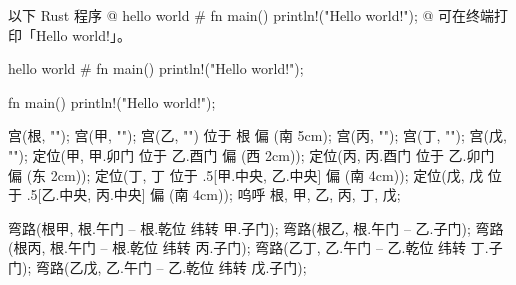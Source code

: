 \usemodule[zhfonts]
\setuptyping[before=,after=]
\startbuffer[all]
以下 Rust 程序
@ hello world #
fn main() {
    println!("Hello world!");
}
@
可在终端打印「Hello world!」。
\stopbuffer

\startbuffer[hello]
hello world #
fn main() {
    println!("Hello world!");
}
\stopbuffer

\startbuffer[foo]
fn main() {
    println!("Hello world!");
}
\stopbuffer


宫(根, "\startTEXpage\typebuffer[all]\stopTEXpage");
宫(甲, "");
宫(乙, "\startTEXpage\typebuffer[hello]\stopTEXpage") 位于 根 偏 (南 5cm);
宫(丙, "");
宫(丁, "");
宫(戊, "\startTEXpage\typebuffer[foo]\stopTEXpage");
定位(甲, 甲.卯门 位于 乙.酉门 偏 (西 2cm));
定位(丙, 丙.酉门 位于 乙.卯门 偏 (东 2cm));
定位(丁, 丁 位于 .5[甲.中央, 乙.中央] 偏 (南 4cm));
定位(戊, 戊 位于 .5[乙.中央, 丙.中央] 偏 (南 4cm));
呜呼 根, 甲, 乙, 丙, 丁, 戊;

弯路(根甲, 根.午门 -- 根.乾位 纬转 甲.子门);
弯路(根乙, 根.午门 -- 乙.子门);
弯路(根丙, 根.午门 -- 根.乾位 纬转 丙.子门);
弯路(乙丁, 乙.午门 -- 乙.乾位 纬转 丁.子门);
弯路(乙戊, 乙.午门 -- 乙.乾位 纬转 戊.子门);
\stopuseMPgraphic

\startTEXpage[offset=4pt]
\stopTEXpage